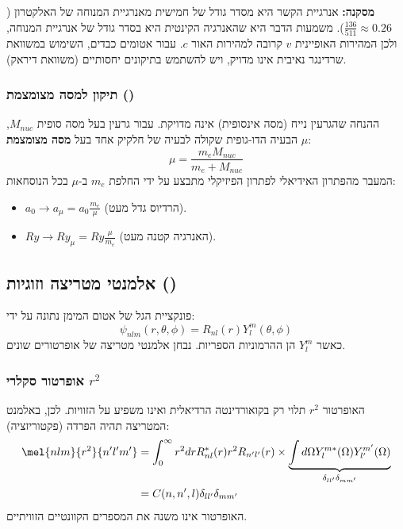 \textbf{מסקנה:} אנרגיית הקשר היא מסדר גודל של חמישית מאנרגיית המנוחה של האלקטרון
($\frac{136}{511}\approx 0.26$). משמעות הדבר היא שהאנרגיה הקינטית היא בסדר גודל
של אנרגיית המנוחה, ולכן המהירות האופיינית $v$ קרובה למהירות האור $c$. עבור
אטומים כבדים, השימוש במשוואת שרדינגר נאיבית אינו מדויק, ויש להשתמש בתיקונים
יחסותיים (משוואת דיראק).
\subsubsection{תיקון למסה מצומצמת ()}
ההנחה שהגרעין נייח (מסה אינסופית) אינה מדויקת. עבור גרעין בעל מסה סופית
$M_{nuc}$, הבעיה הדו-גופית שקולה לבעיה של חלקיק אחד בעל \textbf{מסה מצומצמת}
$\mu$:
\begin{equation}
    \mu = \frac{m_{e} M_{nuc}}{m_{e} + M_{nuc}}
\end{equation}המעבר מהפתרון האידיאלי לפתרון הפיזיקלי מתבצע על ידי החלפת $m_{e}$
ב-$\mu$ בכל הנוסחאות:
\begin{itemize}
    \item $a_{0} \rightarrow a_{\mu}= a_{0} \frac{m_{e}}{\mu}$ (הרדיוס גדל מעט).

    \item $Ry \rightarrow Ry_{\mu}= Ry \frac{\mu}{m_{e}}$ (האנרגיה קטנה מעט).
\end{itemize}
\subsection{אלמנטי מטריצה וזוגיות ()}
פונקציית הגל של אטום המימן נתונה על ידי:
\begin{equation}
    \psi_{nlm}(r, \theta, \phi) = R_{nl}(r) Y_{l}^{m}(\theta, \phi)
\end{equation}כאשר $Y_{l}^{m}$ הן ההרמוניות הספריות. נבחן אלמנטי מטריצה של
אופרטורים שונים.
\subsubsection{אופרטור סקלרי $r^{2}$}
האופרטור $r^{2}$ תלוי רק בקואורדינטה הרדיאלית ואינו משפיע על הזוויות. לכן, באלמנט
המטריצה תהיה הפרדה (פקטוריזציה):
\begin{align}
\mel{n l m}{r^2}{n' l' m'} &= \int_0^\infty r^2 dr
R_{nl}^*(r) r^2 R_{n'l'}(r) \times
\underbrace{\int d\Omega Y_{l}^{m*}(\Omega) Y_{l'}^{m'}(\Omega)}_{\delta_{ll'} \delta_{mm'}} \\
&= C(n,n',l) \delta_{ll'} \delta_{mm'}
\end{align}
האופרטור אינו משנה את המספרים הקוונטיים הזוויתיים.
